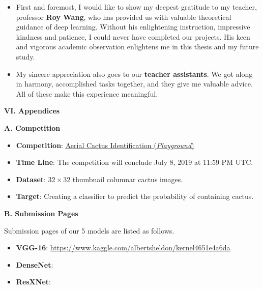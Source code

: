 \documentclass[a4paper]{article}
\begin{document}
\begin{itemize} \item{First and foremost, I would like to show my deepest gratitude to my teacher, professor \textbf{Roy Wang}, who has provided us with valuable theoretical guidance of deep learning. Without his enlightening instruction, impressive kindness and patience, I could never have completed our projects. His keen and vigorous academic observation enlightens me in this thesis and my future study.}
\item{My sincere appreciation also goes to our \textbf{teacher assistants}. We got along in harmony, accomplished tasks together, and they give me valuable advice. All of these make this experience meaningful.}
\end{itemize}

\clearpage
\vspace{5mm}
\begin{center}
\LARGE\textbf{VI. Appendices} \\
\end{center}

\vspace{5mm}
\begin{center}
\large\textbf{A. Competition} \\
\end{center}

\large{
\begin{itemize}
    \item \textbf{Competition}: \underline{\href{https://www.kaggle.com/c/aerial-cactus-identification/overview}{Aerial Cactus Identification (\emph{Playground})}}
    \item \textbf{Time Line}: The competition will conclude July 8, 2019 at 11:59 PM UTC. 
    \item \textbf{Dataset}: $32 \times 32$ thumbnail columnar cactus images.
    \item \textbf{Target}: Creating a classifier to predict the probability of containing cactus.
\end{itemize}
}

\vspace{5mm}
\begin{center}
\large\textbf{B. Submission Pages} \\
\end{center}


\vspace{2mm}
\large{
Submission pages of our 5 models are listed as follows.
\begin{itemize}
    \item \textbf{VGG-16}: \underline{\href{https://www.kaggle.com/albertsheldon/kernel4651e4a6da}{https://www.kaggle.com/albertsheldon/kernel4651e4a6da}}
    \item \textbf{DenseNet}:
    \item \textbf{ResXNet}:
\end{itemize}
}
\end{document}
